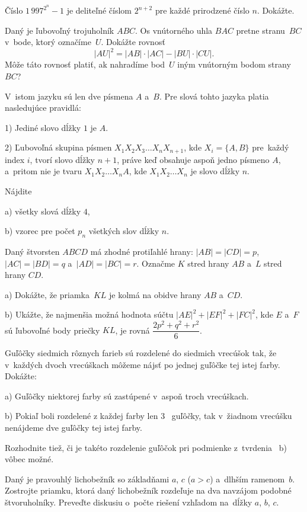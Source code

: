 ﻿{%
Číslo $1\,997^{2^{n}}-1$ je deliteľné číslom $2^{n+2}$ pre
každé prirodzené číslo $n$. Dokážte.}

{%
Daný je ľubovoľný trojuholník $ABC$. Os vnútorného uhla $BAC$
pretne stranu~$BC$ v~bode, ktorý označíme~$U$.
Dokážte rovnosť
$$
|AU|^2=|AB|\cdot|AC|-|BU|\cdot|CU|.
$$
Môže táto rovnosť platiť, ak nahradíme bod~$U$ iným vnútorným
bodom strany~$BC$?}

{%
V~istom jazyku sú len dve písmena $A$ a~$B$. Pre
slová tohto jazyka platia nasledujúce pravidlá:
\item{1)} Jediné slovo dĺžky $1$ je $A$.
\item{2)} Ľubovoľná skupina písmen $X_1X_2X_3\dots X_nX_{n+1}$, kde
$X_i=\{A,B\}$ pre~každý index $i$, tvorí slovo dĺžky $n+1$, práve keď
obsahuje aspoň jedno písmeno $A$, a~pritom nie je tvaru
$X_1X_2\dots X_nA$, kde $X_1X_2\dots X_n$ je slovo dĺžky $n$.

Nájdite
\item{a)} všetky slová dĺžky $4$,
\item{b)} vzorec pre počet $p_n$ všetkých slov dĺžky $n$.
}

{%
Daný štvorsten $ABCD$ má
zhodné protiľahlé hrany: $|AB|=|CD|=p$, $|AC|=|BD|=q$
a~$|AD|=|BC|=r$. Označme $K$ stred hrany $AB$ a~$L$ stred hrany
$CD$.
\item{a)}
Dokážte, že priamka~$KL$ je kolmá na obidve hrany $AB$ a~$CD$.
\item{b)}
Ukážte, že najmenšia možná hodnota súčtu
$|AE|^2+|EF|^2+|FC|^2$, kde $E$ a~$F$ sú ľubovoľné body priečky
$KL$, je rovná $\dfrac{2p^2+q^2+r^2}{6}$.}

{%
Guľôčky siedmich rôznych farieb sú rozdelené do siedmich
vrecúšok tak, že v~každých dvoch vrecúškach môžeme nájsť po jednej
guľôčke tej istej farby. Dokážte:
\item{a)} Guľôčky niektorej farby sú zastúpené v~aspoň troch vrecúškach.
\item{b)} Pokiaľ boli rozdelené z každej farby len 3~ guľôčky, tak v~žiadnom
vrecúšku nenájdeme dve guľôčky tej istej farby.

Rozhodnite tiež, či je takéto rozdelenie guľôčok pri
podmienke z~tvrdenia~ b) vôbec možné.}

{%
Daný je pravouhlý lichobežník so základňami $a$, $c$
($a>c$) a~dlhším ramenom~$b$. Zostrojte priamku, ktorá daný
lichobežník rozdeľuje na dva navzájom podobné štvoruholníky.
Preveďte diskusiu o~počte riešení vzhľadom na~dĺžky $a$, $b$, $c$.}

